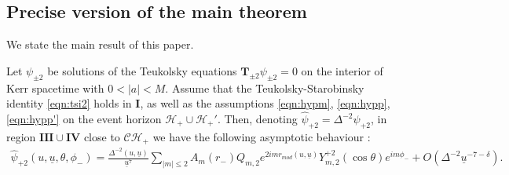 \documentclass[reqno]{amsart}
\numberwithin{equation}{section}
\newcommand{\quatre}{\mathbf{IV}}
\newcommand{\mch}{\mathcal{H}}
\newcommand{\ubar}{{\underline{u}}}
\newcommand{\ch}{\mathcal{CH_+}}
\newcommand{\teuk}{\mathbf{T}}
\newcommand{\psihat}{\widehat{\psi}}
\newcommand{\un}{\mathbf{I}}
\newcommand{\trois}{\mathbf{III}}
\newcommand{\psip}{\psi_{+2}}
\newcommand{\psihatp}{\psihat_{+2}}
\theoremstyle{plain}
\theoremstyle{definition}
\theoremstyle{remark}
\numberwithin{equation}{section}
\begin{document}
\subsection{Precise version of the main theorem}
We state the main result of this paper.
\begin{thm}\label{thm:main}
    Let $\psi_{\pm 2}$ be solutions of the Teukolsky equations $\teuk_{\pm 2}\psi_{\pm2}=0$ on the interior of Kerr spacetime with $0<|a|<M$. Assume that the Teukolsky-Starobinsky identity \eqref{eqn:tsi2} holds in $\un$, as well as the assumptions \eqref{eqn:hypm}, \eqref{eqn:hypp}, \eqref{eqn:hypp'} on the event horizon $\mch_+\cup\mch_+'$. Then, denoting $\psihatp=\Delta^{-2}\psip$, in region $\trois\cup\quatre$ close to $\ch$ we have the following asymptotic behaviour :
\begin{align}\label{eqn:holdssss}
    \psihatp(u,\ubar,\theta,\phi_{-})=\frac{\Delta^{-2}(u,\ubar)}{\ubar^7}\sum_{|m|\leq 2}A_m(r_-)Q_{m,2}e^{2imr_{mod}(u,\ubar)}Y_{m,2}^{+2}(\cos\theta)e^{im\phi_{-}}+O(\Delta^{-2}\ubar^{-7-\delta}).
\end{align} 
\end{thm}
\end{document}
